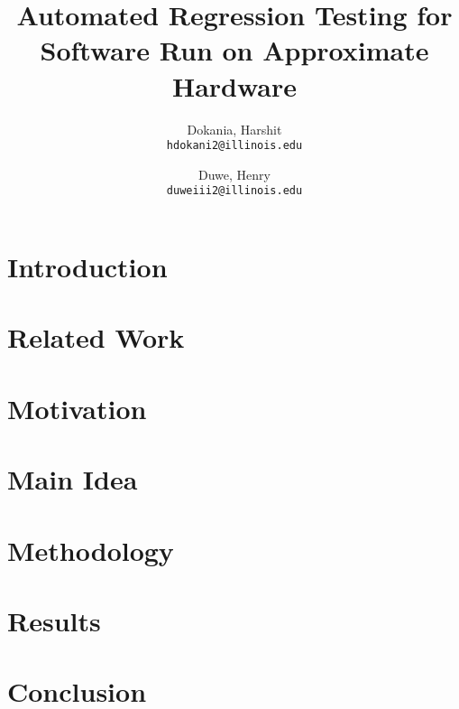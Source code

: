 \documentclass[pageno]{jpaper}
\newcommand{\sectionPull}[1]{\section{#1}\vspace{-0.0ex}}
\begin{document}
\title{
Automated Regression Testing for Software Run on Approximate Hardware
}
\author{
  Dokania, Harshit\\
  \texttt{hdokani2@illinois.edu}
  \and
  Duwe, Henry\\
  \texttt{duweiii2@illinois.edu}
}
\date{}
\maketitle

\thispagestyle{empty}

\begin{abstract}

\end{abstract}

\sectionPull{Introduction} \label{sec:intro}


\sectionPull{Related Work} \label{sec:related}


\sectionPull{Motivation} \label{sec:motivation}


\sectionPull{Main Idea} \label{sec:main_idea}


\sectionPull{Methodology} \label{sec:methodology}


\sectionPull{Results} \label{sec:results}


\sectionPull{Conclusion} \label{sec:concl}



%



\end{document}

